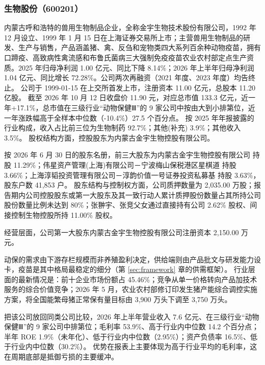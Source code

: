 
\subsubsection{生物股份（600201）}
\label{co:600201}

 内蒙古呼和浩特的兽用生物制品企业，全称金宇生物技术股份有限公司，1992 年 12 月设立、1999 年 1 月 15 日在上海证券交易所上市；主营兽用生物制品的研发、生产与销售，产品涵盖猪、禽、反刍和宠物类四大系列百余种动物疫苗，拥有口蹄疫、高致病性禽流感和布鲁氏菌病三大强制免疫疫苗农业农村部定点生产资质。2025 年归母净利润 1.00 亿元、同比下降 8.14\%；2026 年上半年归母净利润 1.04 亿元、同比增长 72.28\%。公司两次再融资（2021 年度、2023 年度）均告终止。 公司于 1999-01-15 在上交所首发上市，注册资本 11.00 亿元，总股本 11.20 亿股。 截至 2026 年 10 月 12 日收盘价 11.90 元，对应总市值 133.3 亿元，近一年+17.1\%，总市值在三级行业“动物保健Ⅲ”的 9 家公司中按由大到小排第位，近一年涨跌幅高于全样本中位数（-10.4\%）27.5 个百分点。 按 2025 年年报披露的行业构成，收入占比前三位为生物制药 92.7\%；其他(补充) 3.9\%；其他收入 3.5\%。 股权结构方面，控股股东为内蒙古金宇生物控股有限公司。

 按 2026 年 6 月 30 日的股东名册，前三大股东为内蒙古金宇生物控股有限公司 持股 11.29\%；伟星资产管理(上海)有限公司－宁波梅山保税港区星棋道 持股 3.66\%；上海淳韬投资管理有限公司－淳韵价值一号证券投资私募基 持股 3.63\%，股东户数 41,853 户。 股东结构与控制权方面，公司质押数量为 2,035.00 万股；报告期内公司控股股东或第一大股东及其一致行动人累计质押股份数量占其所持公司股份数量比例未达到 80\%；张翀宇、张竞父女通过直接持有公司 2.62\% 股权、间接控制生物控股所持 11.00\% 股权。

 经营层面，公司第一大股东内蒙古金宇生物控股有限公司注册资本 2,150.00 万元。

 动保的需求由下游存栏规模而非养殖盈利决定，供给端则由产品批文与研发能力设卡，疫苗是其中格局最稳定的细分（第 \ref{sec:framework} 章的供需框架）。 行业层面的最新情况是：前十企业市场份额占 45.46\%；竞争从单一价格转向产品加技术服务的综合价值竞争；2026 年 5 月，农业农村部修订印发生猪产能综合调控实施方案，将全国能繁母猪正常保有量目标由 3,900 万头下调至 3,750 万头。

 把该公司放回同类公司比较，2026 年上半年营业收入 7.6 亿元、在三级行业“动物保健Ⅲ”的 9 家公司中排第位；毛利率 53.9\%、高于行业内中位数 14.2 个百分点；半年 ROE 1.9\%（未年化）、低于行业内中位数（2.95\%）；资产负债率 16.5\%、低于行业内中位数（30.2\%）。 优势在报表上主要体现为高于行业平均的毛利率，这在周期底部是抵御亏损的主要缓冲。

